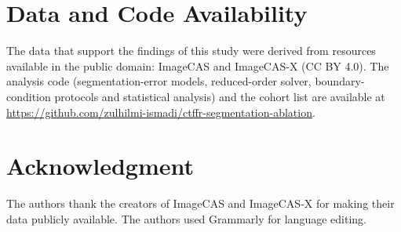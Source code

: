 \documentclass[journal,twoside,web]{ieeecolor}
\begin{document}
\section*{Data and Code Availability}
The data that support the findings of this study were derived from resources available in the public domain: ImageCAS \cite{zeng2023} and ImageCAS-X \cite{imagecasx_data} (CC BY 4.0). The analysis code (segmentation-error models, reduced-order solver, boundary-condition protocols and statistical analysis) and the cohort list are available at \url{https://github.com/zulhilmi-ismadi/ctffr-segmentation-ablation}.

\section*{Acknowledgment}
The authors thank the creators of ImageCAS and ImageCAS-X for making their data publicly available. The authors
used Grammarly for language editing.



\end{document}
